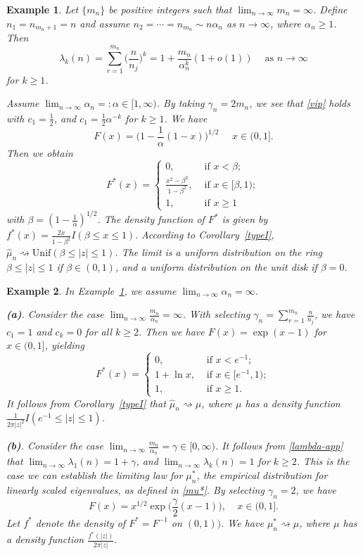 \documentclass[11pt]{article}
\newtheorem{exm}{\textbf{Example}}
\numberwithin{equation}{section}
\begin{document}
\begin{exm}\label{exm2}
     Let $\{m_n\}$ be positive integers such that
$\lim_{n\to\infty}m_n=\infty$.  Define $n_1=n_{m_n+1}=n$ and assume
$n_2=\cdots=n_{m_n}\sim n\alpha_n$ as $n\to\infty$, where
$\alpha_n\ge 1$. Then
\begin{equation}\label{lambda-app}
\lambda_k(n)=\sum^{m_n}_{r=1}\Big(\frac{n}{n_j}\Big)^k=1+
\frac{m_n}{\alpha_n^k}(1+o(1))  ~~~~\mbox{ as }n\to\infty
\end{equation}
for $k\ge 1$.

Assume $\lim_{n\to\infty}\alpha_n=:\alpha\in [1,\infty)$. By taking
$\gamma_n=2m_n$,  we see that \eqref{vip} holds with $c_1=\frac12$,
and $c_1=\frac12\alpha^{-k}$ for $k\ge 1$. We have
\[
F(x)=\Big(1-\frac{1}{\alpha}(1-x)\Big)^{1/2}~~~~~~x\in (0,1].
\]
Then we obtain
\[
 F^{*}(x)=
\left\{
\begin{array}{ll}
{0,} &\mbox{ if } x<\beta; \\
\frac{x^2-\beta^2}{1-\beta^2}, & \mbox{ if } x \in [\beta,1); \\
{1,} & \mbox{ if } x \geq 1
\end{array}
\right.
\]
with $\beta=(1-\frac{1}{\alpha})^{1/2}$. The density function of
$F^*$ is given by $f^*(x)=\frac{2x}{1-\beta^2}I(\beta\le x\le 1).$
According to Corollary~\ref{typeI}, $\hat\mu_n\rightsquigarrow
\mathrm{Unif}(\beta\le |z|\le 1)$. The limit is a uniform
distribution on the ring $\beta\le |z|\le 1$ if $\beta\in (0,1)$,
and a uniform distribution on the unit disk if $\beta=0$.
\end{exm}



\begin{exm}\label{exm3} In Example~\ref{exm2}, we assume
$\lim_{n\to\infty}\alpha_n=\infty$.

\noindent\textbf{(a)}. Consider the case
$\lim_{n\to\infty}\frac{m_n}{\alpha_n}=\infty$. With selecting
$\gamma_n=\sum^{m_n}_{r=1}\frac{n}{n_j}$, we have $c_1=1$ and
$c_k=0$ for all $k\ge 2$. Then we have $F(x)=\exp(x-1)$ for $x\in
(0,1]$, yielding
\[
    F^{*}(x)=
\left\{
\begin{array}{ll}
{0,} &\mbox{ if } x<e^{-1}; \\
1+\ln x, & \mbox{ if } x \in [e^{-1},1); \\
{1,} & \mbox{ if } x \geq 1.
\end{array}
\right.
\]
It follows from Corollary~\ref{typeI} that
$\hat\mu_n\rightsquigarrow \mu$, where $\mu$ has a density function
$\frac{1}{2\pi |z|^2}I(e^{-1}\le |z|\le 1)$.

\noindent\textbf{(b)}.  Consider the case
$\lim_{n\to\infty}\frac{m_n}{\alpha_n}=\gamma\in [0,\infty)$.  It
follows from \eqref{lambda-app} that
$\lim_{n\to\infty}\lambda_1(n)=1+\gamma$, and
$\lim_{n\to\infty}\lambda_k(n)=1$ for $k\ge 2$. This is the case we
can establish the limiting law for $\mu_n^*$, the empirical
distribution for linearly scaled eigenvalues, as defined in
\eqref{mu*}. By selecting $\gamma_n=2$, we have
\[
F(x)=x^{1/2}\exp\big(\frac{\gamma}{2}(x-1)\big), ~~~~~x\in (0,1].
\]
Let $f^*$ denote the density of $F^*=F^{-1}$ on $(0,1))$. We have
$\mu_n^*\rightsquigarrow \mu$, where $\mu$ has a density function
$\frac{f^*(|z|)}{2\pi |z|}$.
\end{exm}
\end{document}
